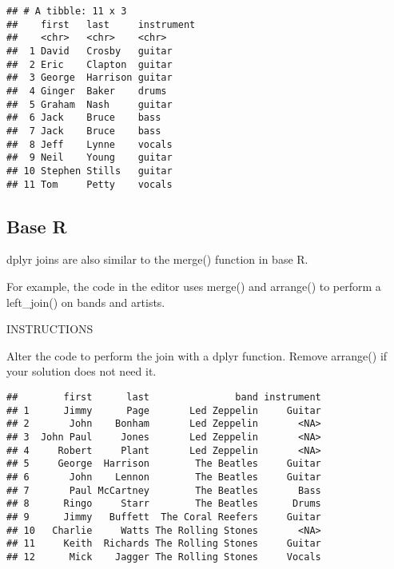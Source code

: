 \documentclass[]{article}
\newenvironment{Shaded}{\begin{snugshade}}{\end{snugshade}}
\newcommand{\KeywordTok}[1]{\textcolor[rgb]{0.13,0.29,0.53}{\textbf{#1}}}
\newcommand{\DataTypeTok}[1]{\textcolor[rgb]{0.13,0.29,0.53}{#1}}
\newcommand{\StringTok}[1]{\textcolor[rgb]{0.31,0.60,0.02}{#1}}
\newcommand{\CommentTok}[1]{\textcolor[rgb]{0.56,0.35,0.01}{\textit{#1}}}
\newcommand{\OtherTok}[1]{\textcolor[rgb]{0.56,0.35,0.01}{#1}}
\newcommand{\OperatorTok}[1]{\textcolor[rgb]{0.81,0.36,0.00}{\textbf{#1}}}
\newcommand{\NormalTok}[1]{#1}
\begin{document}
\begin{verbatim}
## # A tibble: 11 x 3
##    first   last     instrument
##    <chr>   <chr>    <chr>     
##  1 David   Crosby   guitar    
##  2 Eric    Clapton  guitar    
##  3 George  Harrison guitar    
##  4 Ginger  Baker    drums     
##  5 Graham  Nash     guitar    
##  6 Jack    Bruce    bass      
##  7 Jack    Bruce    bass      
##  8 Jeff    Lynne    vocals    
##  9 Neil    Young    guitar    
## 10 Stephen Stills   guitar    
## 11 Tom     Petty    vocals
\end{verbatim}

\subsection{Base R}\label{base-r}

dplyr joins are also similar to the merge() function in base R.

For example, the code in the editor uses merge() and arrange() to
perform a left\_join() on bands and artists.

INSTRUCTIONS

Alter the code to perform the join with a dplyr function. Remove
arrange() if your solution does not need it.

\begin{Shaded}
\end{Shaded}

\begin{verbatim}
##        first      last               band instrument
## 1      Jimmy      Page       Led Zeppelin     Guitar
## 2       John    Bonham       Led Zeppelin       <NA>
## 3  John Paul     Jones       Led Zeppelin       <NA>
## 4     Robert     Plant       Led Zeppelin       <NA>
## 5     George  Harrison        The Beatles     Guitar
## 6       John    Lennon        The Beatles     Guitar
## 7       Paul McCartney        The Beatles       Bass
## 8      Ringo     Starr        The Beatles      Drums
## 9      Jimmy   Buffett  The Coral Reefers     Guitar
## 10   Charlie     Watts The Rolling Stones       <NA>
## 11     Keith  Richards The Rolling Stones     Guitar
## 12      Mick    Jagger The Rolling Stones     Vocals
\end{verbatim}
\end{document}
